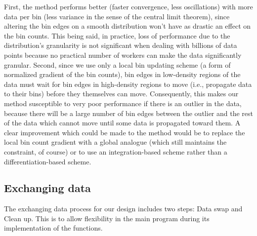 \documentclass{article}
\begin{document}
First, the method performs better (faster convergence, less oscillations) with more data per bin (less variance in the sense of the central limit theorem), since altering the bin edges on a smooth distribution won't have as drastic an effect on the bin counts. This being said, in practice, loss of performance due to the distribution's granularity is not significant when dealing with billions of data points because no practical number of workers can make the data significantly granular. Second, since we use only a local bin updating scheme (a form of normalized gradient of the bin counts), bin edges in low-density regions of the data must wait for bin edges in high-density regions to move (i.e., propagate data to their bins) before they themselves can move. Consequently, this makes our method susceptible to very poor performance if there is an outlier in the data, because there will be a large number of bin edges between the outlier and the rest of the data which cannot move until some data is propagated toward them. A clear improvement which could be made to the method would be to replace the local bin count gradient with a global analogue (which still maintains the constraint, of course) or to use an integration-based scheme rather than a differentiation-based scheme.

\subsection{Exchanging data}
The exchanging data process for our design includes two steps: Data swap and Clean up. This is to allow flexibility in the main program during its implementation of the functions.
\end{document}
